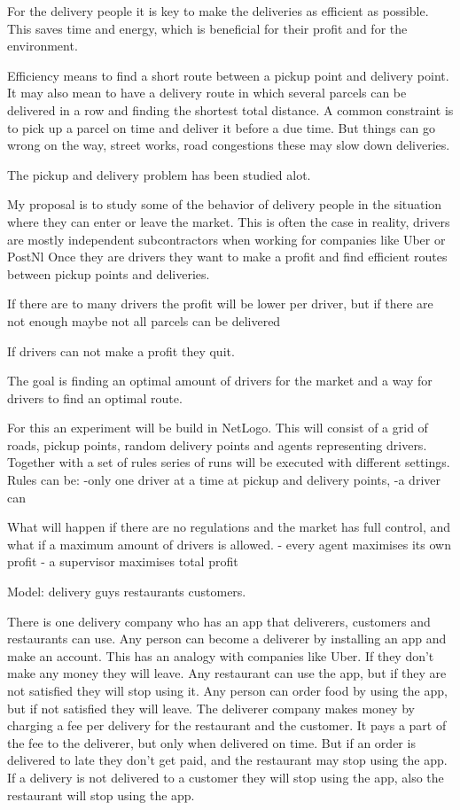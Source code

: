 For the delivery people it is key to make the deliveries as efficient as possible.
This saves time and energy, which is beneficial for their profit and for the environment.

Efficiency means to find a short route between a pickup point and delivery point.
It may also mean to have a delivery route in which several parcels can be delivered in a row and finding the shortest total distance.
A common constraint is to pick up a parcel on time and deliver it before a due time.
But things can go wrong on the way, street works, road congestions these may slow down deliveries.

The pickup and delivery problem has been studied alot.

My proposal is to study some of the behavior of delivery people in the situation where they can enter or leave the market.
This is often the case in reality, drivers are mostly independent subcontractors when working for companies like Uber or PostNl
Once they are drivers they want to make a profit and find efficient routes between pickup points and deliveries.

If there are to many drivers the profit will be lower per driver, but if there are not enough maybe not all parcels can be delivered

If drivers can not make a profit they quit.

The goal is finding an optimal amount of drivers for the market and a way for drivers to find an optimal route.

For this an experiment will be build in NetLogo.
This will consist of a grid of roads, pickup points, random delivery points and agents representing drivers.
Together with a set of rules series of runs will be executed with different settings.
Rules can be:
-only one driver at a time at pickup and delivery points,
-a driver can

What will happen if there are no regulations and the market has full control, and what if a maximum amount of drivers is allowed.
- every agent maximises its own profit
- a supervisor maximises total profit

Model:
delivery guys
restaurants
customers.

There is one delivery company who has an app that deliverers, customers and restaurants can use.
Any person can become a deliverer by installing an app and make an account.
This has an analogy with companies like Uber.
If they don't make any money they will leave.
Any restaurant can use the app, but if they are not satisfied they will stop using it.
Any person can order food by using the app, but if not satisfied they will leave.
The deliverer company makes money by charging a fee per delivery for the restaurant and the customer.
It pays a part of the fee to the deliverer, but only when delivered on time.
But if an order is delivered to late they don't get paid, and the restaurant may stop using the app.
If a delivery is not delivered to a customer they will stop using the app, also the restaurant will stop using the app.

